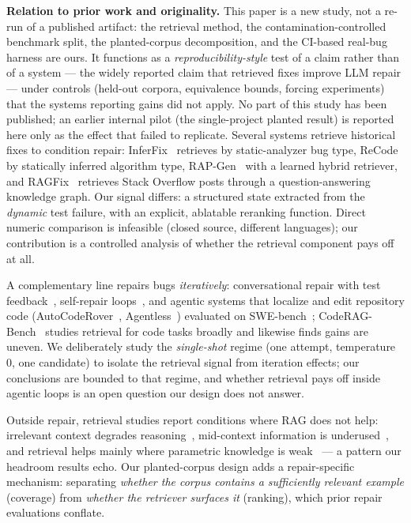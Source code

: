 \documentclass[10pt,conference]{IEEEtran}
\begin{document}
\textbf{Relation to prior work and originality.} This paper is a new
study, not a re-run of a published artifact: the retrieval method, the
contamination-controlled benchmark split, the planted-corpus decomposition,
and the CI-based real-bug harness are ours. It functions as a
\emph{reproducibility-style} test of a claim rather than of a system ---
the widely reported claim that retrieved fixes improve LLM repair --- under
controls (held-out corpora, equivalence bounds, forcing experiments) that
the systems reporting gains did not apply. No part of this study has been
published; an earlier internal pilot (the single-project planted result) is
reported here only as the effect that failed to replicate.
Several systems retrieve historical fixes to condition repair:
InferFix~\cite{inferfix} retrieves by static-analyzer bug type,
ReCode~\cite{recode} by statically inferred algorithm type,
RAP-Gen~\cite{rapgen} with a learned hybrid retriever, and
RAGFix~\cite{ragfix} retrieves Stack Overflow posts through a
question-answering knowledge graph. Our signal differs: a structured state
extracted from the \emph{dynamic} test failure, with an explicit, ablatable
reranking function. Direct numeric comparison is infeasible (closed source,
different languages); our contribution is a controlled analysis of whether
the retrieval component pays off at all.

A complementary line repairs bugs \emph{iteratively}: conversational repair
with test feedback~\cite{chatrepair}, self-repair loops~\cite{selfrepair},
and agentic systems that localize and edit repository code
(AutoCodeRover~\cite{autocoderover}, Agentless~\cite{agentless}) evaluated
on SWE-bench~\cite{swebench}; CodeRAG-Bench~\cite{coderagbench} studies
retrieval for code tasks broadly and likewise finds gains are uneven. We
deliberately study the \emph{single-shot} regime (one attempt, temperature
0, one candidate) to isolate the retrieval signal from iteration effects;
our conclusions are bounded to that regime, and whether retrieval pays off
inside agentic loops is an open question our design does not answer.

Outside repair, retrieval studies report conditions where RAG does not help:
irrelevant context degrades reasoning~\cite{distracted}, mid-context
information is underused~\cite{lostinmiddle}, and retrieval helps mainly
where parametric knowledge is weak~\cite{whennottotrust} --- a pattern our
headroom results echo. Our planted-corpus design adds a repair-specific
mechanism: separating \emph{whether the corpus contains a sufficiently
relevant example} (coverage) from \emph{whether the retriever surfaces it}
(ranking), which prior repair evaluations conflate.
\end{document}
